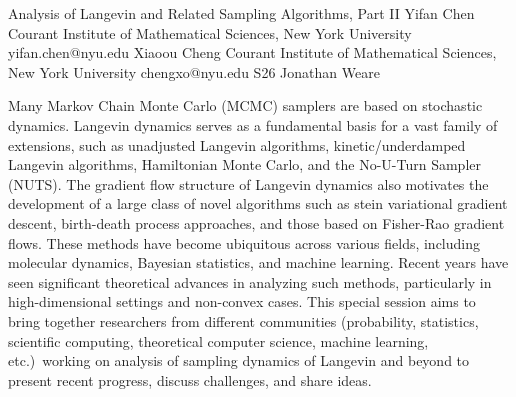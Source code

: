 

\clearpage

\begin{session}
 {Analysis of Langevin and Related Sampling Algorithms, Part II}%
 {Yifan Chen}%
 {Courant Institute of Mathematical Sciences, New York University}%
 {yifan.chen@nyu.edu}%
 {Xiaoou Cheng}%
 {Courant Institute of Mathematical Sciences, New York University}%
 {chengxo@nyu.edu}%
 {S26}%
 {Jonathan Weare}%

 Many Markov Chain Monte Carlo (MCMC) samplers are based on stochastic dynamics. Langevin dynamics serves as a fundamental basis for a vast family of extensions, such as unadjusted Langevin algorithms, kinetic/underdamped Langevin algorithms, Hamiltonian Monte Carlo, and the No-U-Turn Sampler (NUTS). The gradient flow structure of Langevin dynamics also motivates the development of a large class of novel algorithms such as stein variational gradient descent, birth-death process approaches, and those based on Fisher-Rao gradient flows. These methods have become ubiquitous across various fields, including molecular dynamics, Bayesian statistics, and machine learning. Recent years have seen significant theoretical advances in analyzing such methods, particularly in high-dimensional settings and non-convex cases. This special session aims to bring together researchers from different communities (probability, statistics, scientific computing, theoretical computer science, machine learning, etc.)\ working on analysis of sampling dynamics of Langevin and beyond to present recent progress, discuss challenges, and share ideas.
\end{session}



\clearpage

